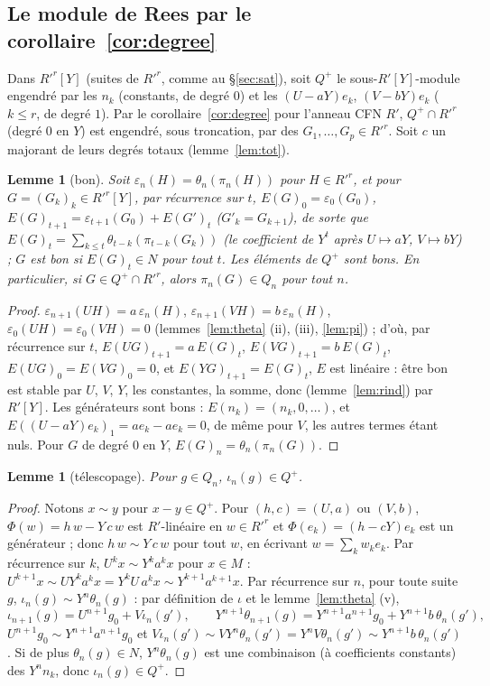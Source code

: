 \documentclass[11pt]{amsart}
\newtheorem{lemma}[theorem]{Lemme}
\theoremstyle{definition}
\theoremstyle{remark}
\begin{document}
\subsection{Le module de Rees par le corollaire~\ref{cor:degree}}
Dans $R'^r[Y]$ (suites de $R'^r$, comme au \S\ref{sec:sat}), soit $Q^+$ le
sous-$R'[Y]$-module engendré par les $n_k$ (constants, de degré $0$) et
les $(U-aY)e_k$, $(V-bY)e_k$ ($k\le r$, de degré $1$). Par le
corollaire~\ref{cor:degree} pour l'anneau CFN $R'$, $Q^+\cap R'^r$ (degré
$0$ en $Y$) est engendré, sous troncation, par des
$G_1,\dots,G_p\in R'^r$. Soit $c$ un majorant de leurs degrés totaux
(lemme~\ref{lem:tot}).

\begin{lemma}[bon]\label{lem:good}
Soit $\varepsilon_n(H)=\theta_n(\pi_n(H))$ pour $H\in R'^r$, et pour
$G=(G_k)_k\in R'^r[Y]$, par récurrence sur $t$,
$E(G)_0=\varepsilon_0(G_0)$, $E(G)_{t+1}=\varepsilon_{t+1}(G_0)+E(G')_t$
($G'_k=G_{k+1}$), de sorte que
$E(G)_t=\sum_{k\le t}\theta_{t-k}(\pi_{t-k}(G_k))$ (le coefficient de
$Y^t$ après $U\mapsto aY$, $V\mapsto bY$) ; $G$ est \emph{bon} si
$E(G)_t\in N$ pour tout $t$. Les éléments de $Q^+$ sont bons. En
particulier, si $G\in Q^+\cap R'^r$, alors $\pi_n(G)\in Q_n$ pour tout $n$.
\end{lemma}

\begin{proof}
$\varepsilon_{n+1}(UH)=a\,\varepsilon_n(H)$,
$\varepsilon_{n+1}(VH)=b\,\varepsilon_n(H)$,
$\varepsilon_0(UH)=\varepsilon_0(VH)=0$ (lemmes~\ref{lem:theta}
(ii), (iii), \ref{lem:pi}) ; d'où, par récurrence sur $t$,
$E(UG)_{t+1}=a\,E(G)_t$, $E(VG)_{t+1}=b\,E(G)_t$, $E(UG)_0=E(VG)_0=0$,
et $E(YG)_{t+1}=E(G)_t$, $E$ est
linéaire : être bon est stable par $U$, $V$, $Y$, les constantes, la
somme, donc (lemme~\ref{lem:rind}) par $R'[Y]$. Les générateurs sont
bons : $E(n_k)=(n_k,0,\dots)$, et $E((U-aY)e_k)_1=ae_k-ae_k=0$, de même
pour $V$, les autres termes étant nuls. Pour $G$ de degré $0$ en $Y$,
$E(G)_n=\theta_n(\pi_n(G))$.
\end{proof}

\begin{lemma}[télescopage]\label{lem:tele}
Pour $g\in Q_n$, $\iota_n(g)\in Q^+$.
\end{lemma}

\begin{proof}
Notons $x\sim y$ pour $x-y\in Q^+$. Pour $(h,c)=(U,a)$ ou $(V,b)$,
$\Phi(w)=h\,w-Y\,c\,w$ est $R'$-linéaire en $w\in R'^r$ et
$\Phi(e_k)=(h-cY)e_k$ est un générateur ; donc $h\,w\sim Y\,c\,w$ pour
tout $w$, en écrivant $w=\sum_kw_ke_k$. Par récurrence sur $k$,
$U^kx\sim Y^ka^kx$ pour $x\in M$ :
$U^{k+1}x\sim UY^ka^kx=Y^kU\,a^kx\sim Y^{k+1}a^{k+1}x$. Par récurrence sur
$n$, pour toute suite $g$, $\iota_n(g)\sim Y^n\theta_n(g)$ : par
définition de $\iota$ et le lemme~\ref{lem:theta} (v),
\[\iota_{n+1}(g)=U^{n+1}g_0+V\iota_n(g'),\qquad
Y^{n+1}\theta_{n+1}(g)=Y^{n+1}a^{n+1}g_0+Y^{n+1}b\,\theta_n(g'),\]
$U^{n+1}g_0\sim Y^{n+1}a^{n+1}g_0$ et
$V\iota_n(g')\sim VY^n\theta_n(g')=Y^nV\theta_n(g')\sim Y^{n+1}b\,\theta_n(g')$.
Si de plus $\theta_n(g)\in N$, $Y^n\theta_n(g)$ est une combinaison (à
coefficients constants) des $Y^nn_k$, donc $\iota_n(g)\in Q^+$.
\end{proof}
\end{document}
